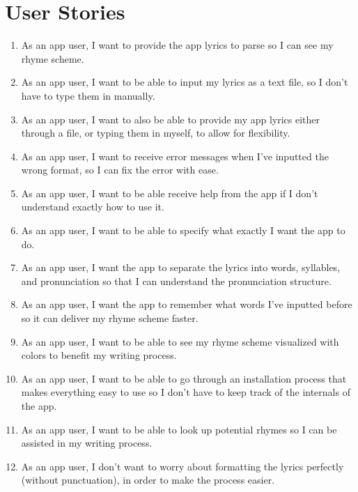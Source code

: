 \documentclass[12pt,a4paper]{report}
\begin{document}
\section{User Stories}
\begin{enumerate}
    \item As an app user, I want to provide the app lyrics to parse so I can see my rhyme scheme.

    \item As an app user, I want to be able to input my lyrics as a text file, so I don't have to type them in manually.
    \item As an app user, I want to also be able to provide my app lyrics either through a file, or typing them in myself, to allow for flexibility.
    \item As an app user, I want to receive error messages when I've inputted the wrong format, so I can fix the error with ease.
    \item As an app user, I want to be able receive help from the app if I don't understand exactly how to use it.
    \item As an app user, I want to be able to specify what exactly I want the app to do.
    \item As an app user, I want the app to separate the lyrics into words, syllables, and pronunciation so that I can understand the pronunciation structure.
    \item As an app user, I want the app to remember what words I've inputted before so it can deliver my rhyme scheme faster.
    \item As an app user, I want to be able to see my rhyme scheme visualized with colors to benefit my writing process.
    \item As an app user, I want to be able to go through an installation process that makes everything easy to use so I don't have to keep track of the internals of the app.
    \item As an app user, I want to be able to look up potential rhymes so I can be assisted in my writing process.
    \item As an app user, I don't want to worry about formatting the lyrics perfectly (without punctuation), in order to make the process easier.
\end{enumerate}
\end{document}
